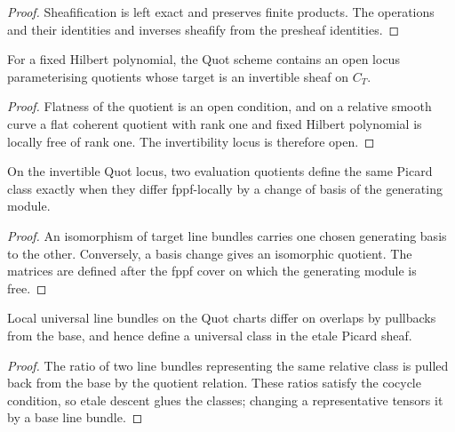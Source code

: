 \begin{proof}
  Sheafification is left exact and preserves finite products.  The operations
  and their identities and inverses sheafify from the presheaf identities.
\end{proof}

\begin{proposition}
  \label{pa-prop-invertible-quot-locus}
  \cite{kleiman-picard,nitsure-hilbert-quot}
  For a fixed Hilbert polynomial, the Quot scheme contains an open locus
  parameterising quotients whose target is an invertible sheaf on \(C_T\).
\end{proposition}

\begin{proof}
  Flatness of the quotient is an open condition, and on a relative smooth
  curve a flat coherent quotient with rank one and fixed Hilbert polynomial is
  locally free of rank one.  The invertibility locus is therefore open.
\end{proof}

\begin{lemma}
  \label{pa-lem-generator-equivalence}
  \cite{kleiman-picard}
  On the invertible Quot locus, two evaluation quotients define the same
  Picard class exactly when they differ fppf-locally by a change of basis of
  the generating module.
\end{lemma}

\begin{proof}
  An isomorphism of target line bundles carries one chosen generating basis to
  the other.  Conversely, a basis change gives an isomorphic quotient.  The
  matrices are defined after the fppf cover on which the generating module is
  free.
\end{proof}

\begin{lemma}
  \label{pa-lem-universal-class-descent}
  \cite{kleiman-picard}
  Local universal line bundles on the Quot charts differ on overlaps by
  pullbacks from the base, and hence define a universal class in the etale
  Picard sheaf.
\end{lemma}

\begin{proof}
  The ratio of two line bundles representing the same relative class is
  pulled back from the base by the quotient relation.  These ratios satisfy
  the cocycle condition, so etale descent glues the classes; changing a
  representative tensors it by a base line bundle.
\end{proof}

